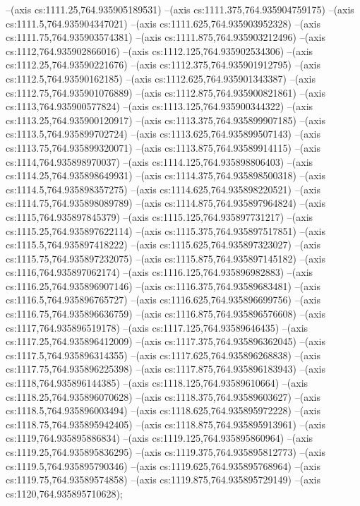 --(axis cs:1111.25,764.935905189531)
--(axis cs:1111.375,764.935904759175)
--(axis cs:1111.5,764.935904347021)
--(axis cs:1111.625,764.935903952328)
--(axis cs:1111.75,764.935903574381)
--(axis cs:1111.875,764.935903212496)
--(axis cs:1112,764.935902866016)
--(axis cs:1112.125,764.935902534306)
--(axis cs:1112.25,764.93590221676)
--(axis cs:1112.375,764.935901912795)
--(axis cs:1112.5,764.93590162185)
--(axis cs:1112.625,764.935901343387)
--(axis cs:1112.75,764.935901076889)
--(axis cs:1112.875,764.935900821861)
--(axis cs:1113,764.935900577824)
--(axis cs:1113.125,764.935900344322)
--(axis cs:1113.25,764.935900120917)
--(axis cs:1113.375,764.935899907185)
--(axis cs:1113.5,764.935899702724)
--(axis cs:1113.625,764.935899507143)
--(axis cs:1113.75,764.935899320071)
--(axis cs:1113.875,764.93589914115)
--(axis cs:1114,764.935898970037)
--(axis cs:1114.125,764.935898806403)
--(axis cs:1114.25,764.935898649931)
--(axis cs:1114.375,764.935898500318)
--(axis cs:1114.5,764.935898357275)
--(axis cs:1114.625,764.935898220521)
--(axis cs:1114.75,764.935898089789)
--(axis cs:1114.875,764.935897964824)
--(axis cs:1115,764.935897845379)
--(axis cs:1115.125,764.935897731217)
--(axis cs:1115.25,764.935897622114)
--(axis cs:1115.375,764.935897517851)
--(axis cs:1115.5,764.935897418222)
--(axis cs:1115.625,764.935897323027)
--(axis cs:1115.75,764.935897232075)
--(axis cs:1115.875,764.935897145182)
--(axis cs:1116,764.935897062174)
--(axis cs:1116.125,764.935896982883)
--(axis cs:1116.25,764.935896907146)
--(axis cs:1116.375,764.93589683481)
--(axis cs:1116.5,764.935896765727)
--(axis cs:1116.625,764.935896699756)
--(axis cs:1116.75,764.935896636759)
--(axis cs:1116.875,764.935896576608)
--(axis cs:1117,764.935896519178)
--(axis cs:1117.125,764.93589646435)
--(axis cs:1117.25,764.935896412009)
--(axis cs:1117.375,764.935896362045)
--(axis cs:1117.5,764.935896314355)
--(axis cs:1117.625,764.935896268838)
--(axis cs:1117.75,764.935896225398)
--(axis cs:1117.875,764.935896183943)
--(axis cs:1118,764.935896144385)
--(axis cs:1118.125,764.93589610664)
--(axis cs:1118.25,764.935896070628)
--(axis cs:1118.375,764.93589603627)
--(axis cs:1118.5,764.935896003494)
--(axis cs:1118.625,764.935895972228)
--(axis cs:1118.75,764.935895942405)
--(axis cs:1118.875,764.935895913961)
--(axis cs:1119,764.935895886834)
--(axis cs:1119.125,764.935895860964)
--(axis cs:1119.25,764.935895836295)
--(axis cs:1119.375,764.935895812773)
--(axis cs:1119.5,764.935895790346)
--(axis cs:1119.625,764.935895768964)
--(axis cs:1119.75,764.93589574858)
--(axis cs:1119.875,764.935895729149)
--(axis cs:1120,764.935895710628);

